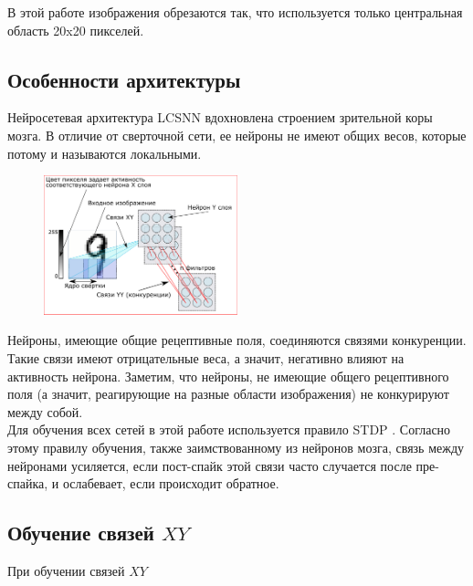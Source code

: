 \documentclass[a4paper]{article}
\begin{document}
В этой работе изображения обрезаются так, что используется только центральная область 20x20 пикселей.\\

\subsection{Особенности архитектуры}
Нейросетевая архитектура LCSNN \cite{saunders2019locally} вдохновлена строением зрительной коры мозга. В отличие от сверточной сети, ее нейроны не имеют общих весов, которые потому и называются локальными.

\begin{figure} \label{MNIST} 
 \centering
 \includegraphics[width=0.5\textwidth]{LCSNN.pdf}
\end{figure}

Нейроны, имеющие общие рецептивные поля, соединяются связями конкуренции. Такие связи имеют отрицательные веса, а значит, негативно влияют на активность нейрона. Заметим, что нейроны, не имеющие общего рецептивного поля (а значит, реагирующие на разные области изображения) не конкурируют между собой.\\

Для обучения всех сетей в этой работе используется правило STDP \cite{STDP}. Согласно этому правилу обучения, также заимствованному из нейронов мозга, связь между нейронами усиляется, если пост-спайк этой связи часто случается после пре-спайка, и ослабевает, если происходит обратное.

\subsection{Обучение связей $XY$}
При обучении связей $XY$ 
\end{document}
